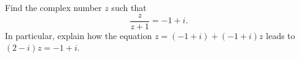 Find the complex number $z$ such that
\[
\dfrac{z}{z+1}=-1+i .
\]
In particular, explain how the equation $z=(-1+i)+(-1+i)z$ leads to $(2-i)z=-1+i$.

